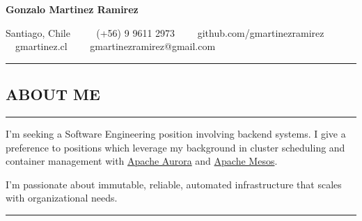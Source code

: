 \documentclass[10pt,letterpaper]{article}
\newcommand\textbox[1]{%
	\parbox{.333\textwidth}{#1}%
}
\newcommand\linedatRIGHT[1]{%
	\par\noindent\rule{17.75cm}{0.4pt}\par\noindent%
	#1\par\noindent%
	\rule[\fontcharht\font`M]{17.75cm}{0.4pt}\par%
}
\begin{document}
\begin{center}{\huge \textbf{Gonzalo Martinez Ramirez}}


Santiago, Chile \ \ \textbullet
\ \ (+56) 9 9611 2973\ \ \textbullet
\ \ github.com/gmartinezramirez\ \ \textbullet
\ \ gmartinez.cl\ \ \textbullet
\ \ gmartinezramirez@gmail.com

\end{center}


\hrule
\vspace{-1.0em}
\subsection*{ABOUT ME}
\vspace{-0.3em}
\hrule
\vspace{0.5em}


\noindent I'm seeking a Software Engineering position involving backend systems.
I give a preference to positions which leverage my background in cluster
scheduling and container management with \href{aurora.apache.org}{Apache Aurora}
and \href{mesos.apache.org}{Apache Mesos}.

\noindent I'm passionate about immutable, reliable, automated infrastructure
that scales with organizational needs.
\\

\hrule
\vspace{-1.0em}
\end{document}
